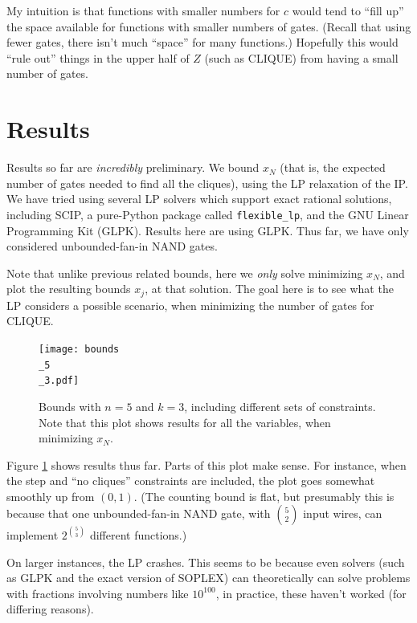 \documentclass[12pt]{article}
\theoremstyle{definition}
\begin{document}
My intuition is that functions with smaller numbers for $c$ would
tend to ``fill up'' the space available for functions with smaller numbers of gates.
(Recall that using fewer gates, there isn't much ``space'' for many functions.)
Hopefully this would ``rule out'' things in the upper half of $Z$ (such as CLIQUE)
from having a small number of gates.

\section{Results}

Results so far are {\em incredibly} preliminary. We bound $x_N$
(that is, the expected number of gates needed to find all the cliques),
using the LP relaxation of the IP. We have tried using several
LP solvers which support exact rational solutions,
including SCIP, a pure-Python package called {\tt flexible\_lp},
and the GNU Linear Programming Kit (GLPK). Results here are
using GLPK. Thus far, we have only considered unbounded-fan-in
NAND gates.

Note that unlike previous related bounds, here we {\em only} solve minimizing
$x_N$, and plot the resulting bounds $x_j$, at that solution. The
goal here is to see what the LP considers a possible scenario, when
minimizing the number of gates for CLIQUE.

\begin{figure}

\centering

\texttt{[image: bounds\\\_5\\\_3.pdf]}

\caption{
Bounds with $n=5$ and $k=3$, including different sets of constraints.
Note that this plot shows results for all the variables, when
minimizing $x_N$.
}
\label{fig:bounds0}

\end{figure}

Figure \ref{fig:bounds0} shows results thus far.
Parts of this plot make sense. For instance, when the
step and ``no cliques'' constraints are included, the
plot goes somewhat smoothly up from $(0,1)$. (The counting
bound is flat, but presumably this is because
that one unbounded-fan-in NAND gate, with ${5 \choose 2}$
input wires, can implement $2^{5 \choose 3}$ different
functions.)

On larger instances, the LP crashes. This seems to be because even
solvers (such as GLPK and the exact version of SOPLEX) can
theoretically can solve problems with fractions involving
numbers like $10^{100}$, in practice, these haven't worked
(for differing reasons).
\end{document}
